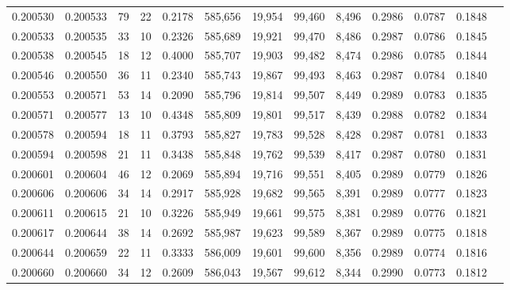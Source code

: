 \begin{tabular}{rrrrrrrrrrrrr}
0.200530 & 0.200533 &    79 &  22 &                                     0.2178 & 585,656 &  19,954 &  99,460 &   8,496 & 0.2986 & 0.0787 & 0.1848 \\
0.200533 & 0.200535 &    33 &  10 &                                     0.2326 & 585,689 &  19,921 &  99,470 &   8,486 & 0.2987 & 0.0786 & 0.1845 \\
0.200538 & 0.200545 &    18 &  12 &                                     0.4000 & 585,707 &  19,903 &  99,482 &   8,474 & 0.2986 & 0.0785 & 0.1844 \\
0.200546 & 0.200550 &    36 &  11 &                                     0.2340 & 585,743 &  19,867 &  99,493 &   8,463 & 0.2987 & 0.0784 & 0.1840 \\
0.200553 & 0.200571 &    53 &  14 &                                     0.2090 & 585,796 &  19,814 &  99,507 &   8,449 & 0.2989 & 0.0783 & 0.1835 \\
0.200571 & 0.200577 &    13 &  10 &                                     0.4348 & 585,809 &  19,801 &  99,517 &   8,439 & 0.2988 & 0.0782 & 0.1834 \\
0.200578 & 0.200594 &    18 &  11 &                                     0.3793 & 585,827 &  19,783 &  99,528 &   8,428 & 0.2987 & 0.0781 & 0.1833 \\
0.200594 & 0.200598 &    21 &  11 &                                     0.3438 & 585,848 &  19,762 &  99,539 &   8,417 & 0.2987 & 0.0780 & 0.1831 \\
0.200601 & 0.200604 &    46 &  12 &                                     0.2069 & 585,894 &  19,716 &  99,551 &   8,405 & 0.2989 & 0.0779 & 0.1826 \\
0.200606 & 0.200606 &    34 &  14 &                                     0.2917 & 585,928 &  19,682 &  99,565 &   8,391 & 0.2989 & 0.0777 & 0.1823 \\
0.200611 & 0.200615 &    21 &  10 &                                     0.3226 & 585,949 &  19,661 &  99,575 &   8,381 & 0.2989 & 0.0776 & 0.1821 \\
0.200617 & 0.200644 &    38 &  14 &                                     0.2692 & 585,987 &  19,623 &  99,589 &   8,367 & 0.2989 & 0.0775 & 0.1818 \\
0.200644 & 0.200659 &    22 &  11 &                                     0.3333 & 586,009 &  19,601 &  99,600 &   8,356 & 0.2989 & 0.0774 & 0.1816 \\
0.200660 & 0.200660 &    34 &  12 &                                     0.2609 & 586,043 &  19,567 &  99,612 &   8,344 & 0.2990 & 0.0773 & 0.1812 \\

\end{tabular}
